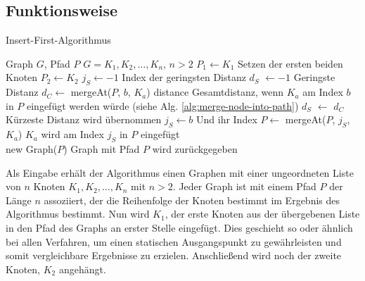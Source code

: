 \subsection{Funktionsweise}
\begin{algorithm}
    \caption{Insert-First-Algorithmus}
    \label{alg:insert-first}
    \begin{algorithmic}[1]
        \Require Graph $G$, Pfad $P$
        \Require $G = K_1,K_2,\ldots,K_n$, $n > 2$
        \State $P_1 \gets K_1$
        \Comment Setzen der ersten beiden Knoten
        \State $P_2 \gets K_2$
            \State $j_S \gets -1$
            \Comment Index der geringsten Distanz
            \State $d_S$ $\gets -1$
            \Comment Geringste Distanz
                \State $d_C \gets$ mergeAt($P$, $b$, $K_a$) distance
                \Comment Gesamtdistanz, wenn $K_a$ am Index $b$ in $P$ eingefügt werden würde (siehe Alg. \vref{alg:merge-node-into-path})
                    \State $d_S$ $\gets$ $d_C$
                    \Comment Kürzeste Distanz wird übernommen
                    \State $j_S \gets b$
                    \Comment Und ihr Index
                \EndIf
            \EndFor
            \State $P \gets$ mergeAt($P$, $j_S$, $K_a$)
            \Comment $K_a$ wird am Index $j_S$ in $P$ eingefügt
        \EndFor \\
        \Return new Graph($P$)
        \Comment Graph mit Pfad $P$ wird zurückgegeben
    \end{algorithmic}
\end{algorithm}
Als Eingabe erhält der Algorithmus einen Graphen mit einer ungeordneten Liste von $n$ Knoten $K_1,K_2,\ldots,K_n$ mit $n > 2$.
Jeder Graph ist mit einem Pfad $P$ der Länge $n$ assoziiert, der die Reihenfolge der Knoten bestimmt im Ergebnis des Algorithmus bestimmt. 
Nun wird $K_1$, der erste Knoten aus der übergebenen Liste in den Pfad des Graphs an erster Stelle eingefügt. 
Dies geschieht so oder ähnlich bei allen Verfahren, um einen statischen Ausgangspunkt zu gewährleisten und somit vergleichbare Ergebnisse zu erzielen.
Anschließend wird noch der zweite Knoten, $K_2$ angehängt.

